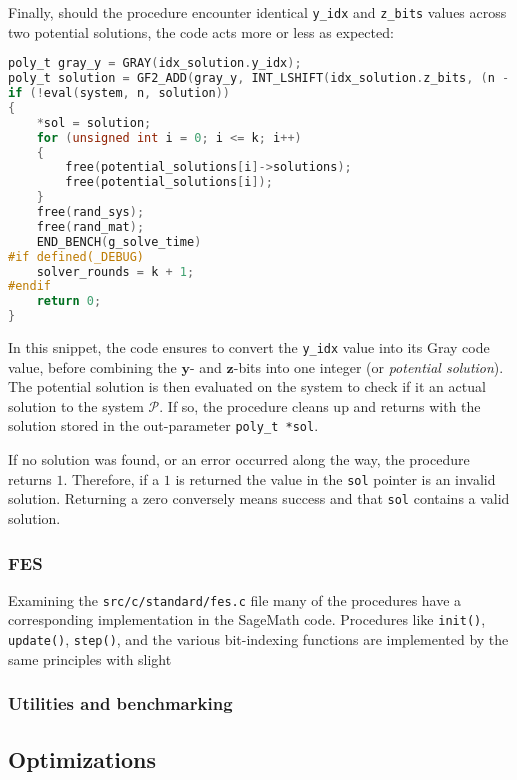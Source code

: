 
Finally, should the procedure encounter identical \texttt{y\_idx} and \texttt{z\_bits} values across two potential solutions, the code acts more or less as expected:
\begin{lstlisting}[language=C,style=mystyle]
poly_t gray_y = GRAY(idx_solution.y_idx);
poly_t solution = GF2_ADD(gray_y, INT_LSHIFT(idx_solution.z_bits, (n - n1)));
if (!eval(system, n, solution))
{
    *sol = solution;
    for (unsigned int i = 0; i <= k; i++)
    {
        free(potential_solutions[i]->solutions);
        free(potential_solutions[i]);
    }
    free(rand_sys);
    free(rand_mat);
    END_BENCH(g_solve_time)
#if defined(_DEBUG)
    solver_rounds = k + 1;
#endif
    return 0;
}
\end{lstlisting}
In this snippet, the code ensures to convert the \texttt{y\_idx} value into its Gray code value, before combining the $\mathbf{y}$- and $\mathbf{z}$-bits into one integer (or \textit{potential solution}). The potential solution is then evaluated on the system to check if it an actual solution to the system $\mathcal{P}$. If so, the procedure cleans up and returns with the solution stored in the out-parameter \texttt{poly\_t *sol}.

If no solution was found, or an error occurred along the way, the procedure returns $1$. Therefore, if a $1$ is returned the value in the \texttt{sol} pointer is an invalid solution. Returning a zero conversely means success and that \texttt{sol} contains a valid solution.

\subsubsection{FES} \label{sec:impl:c:fes}
Examining the \texttt{src/c/standard/fes.c} file many of the procedures have a corresponding implementation in the SageMath code. Procedures like \texttt{init()}, \texttt{update()}, \texttt{step()}, and the various bit-indexing functions are implemented by the same principles with slight 


\subsubsection{Utilities and benchmarking}

\subsection{Optimizations} \label{sec:impl:opt}

